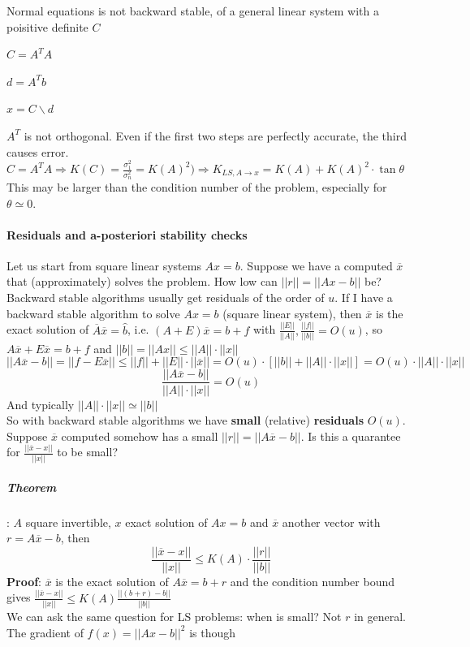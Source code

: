 \documentclass[10pt]{report}
\begin{document}
Normal equations is not backward stable, of a general linear system with a poisitive definite $C$ \begin{list}{}{}
	\item $C = A^TA$
	\item $d = A^Tb$
	\item $x = C \backslash d$
\end{list}
$A^T$ is not orthogonal. Even if the first two steps are perfectly accurate, the third causes error.
$C=A^TA\Rightarrow K(C) = \frac{\sigma_1^2}{\sigma_n^2} = K(A)^2) \Rightarrow K_{LS,A\rightarrow x} = K(A)+K(A)^2\cdot\tan\theta$\\
This may be larger than the condition number of the problem, especially for $\theta\simeq 0$.
\paragraph{Residuals and a-posteriori stability checks} Let us start from square linear systems $Ax=b$. Suppose we have a computed $\overline{x}$ that (approximately) solves the problem. How low can $||r|| = ||Ax-b||$ be? Backward stable algorithms usually get residuals of the order of $u$. If I have a backward stable algorithm to solve $Ax=b$ (square linear system), then $\overline{x}$ is the exact solution of $\overline{A}\overline{x}=\hat{b}$, i.e. $(A+E)\overline{x}=b+f$ with $\frac{||E||}{||A||},\frac{||f||}{||b||} = O(u)$, so $A\overline{x}+E\overline{x}=b+f$ and $||b|| = ||Ax|| \leq ||A||\cdot||x||$
$$||A\overline{x}-b||=||f-E\overline{x}||\leq ||f||+||E||\cdot||\overline{x}||=O(u)\cdot[||b||+||A||\cdot||x||]=O(u)\cdot||A||\cdot||x||$$
$$\frac{||A\overline{x}-b||}{||A||\cdot||x||}=O(u)$$
And typically $||A||\cdot||x||\simeq ||b||$\\
So with backward stable algorithms we have \textbf{small} (relative) \textbf{residuals} $O(u)$.\\
Suppose $\overline{x}$ computed somehow has a small $||r||=||A\overline{x}-b||$. Is this a quarantee for $\frac{||\overline{x}-x||}{||x||}$ to be small?
\subparagraph{Theorem}: $A$ square invertible, $x$ exact solution of $Ax = b$ and $\overline{x}$ another vector with $r = A\overline{x}-b$, then $$\frac{||\overline{x}-x||}{||x||}\leq K(A)\cdot\frac{||r||}{||b||}$$
\textbf{Proof}: $\overline{x}$ is the exact solution of $A\overline{x}=b+r$ and the condition number bound gives $\frac{||\overline{x}-x||}{||x||}\leq K(A)\frac{||(b+r)-b||}{||b||}$\\
We can ask the same question for LS problems: when is small? Not $r$ in general. The gradient of $f(x) = ||Ax-b||^2$ is though 
\end{document}
